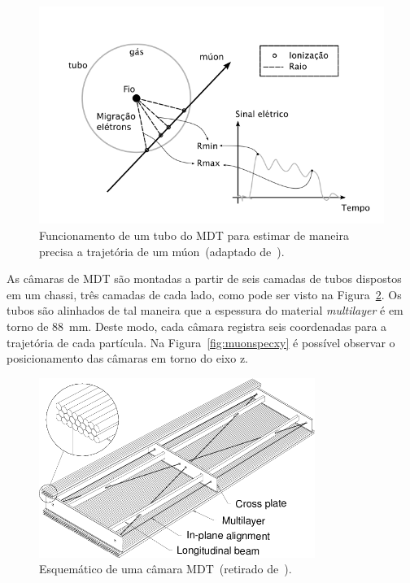 \begin{figure}[htpb!]
    \centering
        \includegraphics{images/mdt_ion.png}
        \caption[Funcionamento de um tubo do MDT para estimar de maneira precisa a
        trajetória de um múon.]{ Funcionamento de um tubo
        do MDT para estimar de maneira precisa a trajetória de um múon~(adaptado
        de~\cite{MUONTDR1997}).}
        \label{fig:mdttube}
\end{figure}



As câmaras de MDT são montadas a partir de seis camadas de tubos dispostos em um
chassi, três camadas de cada lado, como pode ser visto na
Figura~\ref{fig:mdtchamber}. Os tubos são alinhados de tal maneira que a
espessura do material \emph{multilayer} é em torno de 88~mm. Deste modo, cada
câmara registra seis coordenadas para a trajetória de cada partícula. Na
Figura~\ref{fig:muonspecxy} é possível observar o posicionamento das câmaras em
torno do eixo z.

\begin{figure}[htpb!]
    \centering
        \includegraphics[width=0.8\textwidth]{images/MDTChamber.png}
        \caption[Esquemático de uma câmara MDT.]{Esquemático de uma câmara
        MDT~(retirado de~\cite{MUONTDR1997}).}
        \label{fig:mdtchamber}
\end{figure}


